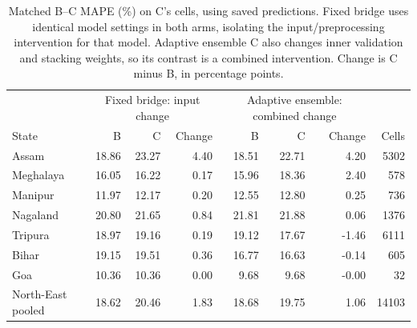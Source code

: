 \begin{table}[t]
\caption{Matched B--C MAPE (\%) on C's cells, using saved predictions. Fixed bridge uses identical model settings in both arms, isolating the input/preprocessing intervention for that model. Adaptive ensemble C also changes inner validation and stacking weights, so its contrast is a combined intervention. Change is C minus B, in percentage points.}
\label{tab:matchedprep}
\small
\begin{tabular}{lrrrrrrr}
\toprule
 & \multicolumn{3}{c}{Fixed bridge: input change} & \multicolumn{3}{c}{Adaptive ensemble: combined change} & \\
State & B & C & Change & B & C & Change & Cells \\
\midrule
Assam & 18.86 & 23.27 & 4.40 & 18.51 & 22.71 & 4.20 & 5302 \\
Meghalaya & 16.05 & 16.22 & 0.17 & 15.96 & 18.36 & 2.40 & 578 \\
Manipur & 11.97 & 12.17 & 0.20 & 12.55 & 12.80 & 0.25 & 736 \\
Nagaland & 20.80 & 21.65 & 0.84 & 21.81 & 21.88 & 0.06 & 1376 \\
Tripura & 18.97 & 19.16 & 0.19 & 19.12 & 17.67 & -1.46 & 6111 \\
Bihar & 19.15 & 19.51 & 0.36 & 16.77 & 16.63 & -0.14 & 605 \\
Goa & 10.36 & 10.36 & 0.00 & 9.68 & 9.68 & -0.00 & 32 \\
North-East pooled & 18.62 & 20.46 & 1.83 & 18.68 & 19.75 & 1.06 & 14103 \\
\bottomrule
\end{tabular}
\end{table}
